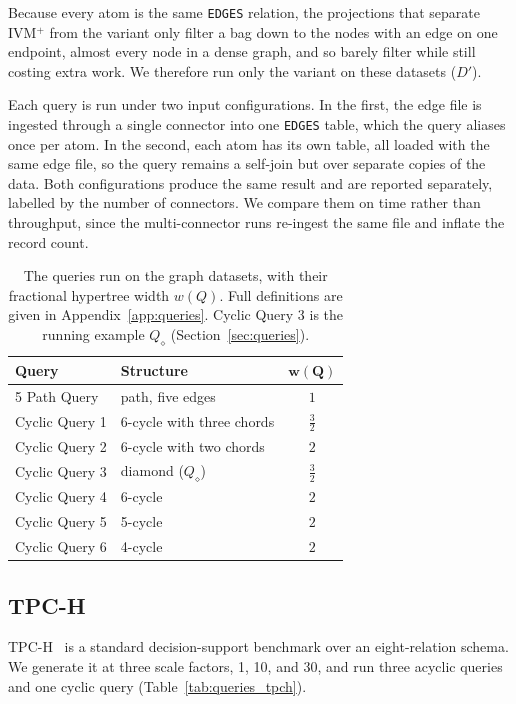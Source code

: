 Because every atom is the same \texttt{EDGES} relation, the projections that separate IVM$^+$ from the variant only filter a bag down to the nodes with an edge on one endpoint, almost every node in a dense graph, and so barely filter while still costing extra work. We therefore run only the variant on these datasets ($D'$).

Each query is run under two input configurations. In the first, the edge file is ingested through a single connector into one \texttt{EDGES} table, which the query aliases once per atom. In the second, each atom has its own table, all loaded with the same edge file, so the query remains a self-join but over separate copies of the data. Both configurations produce the same result and are reported separately, labelled by the number of connectors. We compare them on time rather than throughput, since the multi-connector runs re-ingest the same file and inflate the record count.

\begin{table}[H]
  \centering
  \begin{tabular}{@{}llc@{}}
    \toprule
    \textbf{Query} & \textbf{Structure} & $\boldsymbol{w(Q)}$ \\
    \midrule
    5 Path Query   & path, five edges          & $1$ \\
    Cyclic Query 1 & 6-cycle with three chords & $\tfrac{3}{2}$ \\
    Cyclic Query 2 & 6-cycle with two chords   & $2$ \\
    Cyclic Query 3 & diamond ($Q_\diamond$)    & $\tfrac{3}{2}$ \\
    Cyclic Query 4 & 6-cycle                   & $2$ \\
    Cyclic Query 5 & 5-cycle                   & $2$ \\
    Cyclic Query 6 & 4-cycle                   & $2$ \\
    \bottomrule
  \end{tabular}
  \caption{The queries run on the graph datasets, with their fractional hypertree width $w(Q)$. Full definitions are given in Appendix~\ref{app:queries}. Cyclic Query 3 is the running example $Q_\diamond$ (Section~\ref{sec:queries}).}
  \label{tab:queries_graph}
\end{table}

\subsection{TPC-H}
TPC-H~\cite{poess2000} is a standard decision-support benchmark over an eight-relation schema. We generate it at three scale factors, 1, 10, and 30, and run three acyclic queries and one cyclic query (Table~\ref{tab:queries_tpch}).

